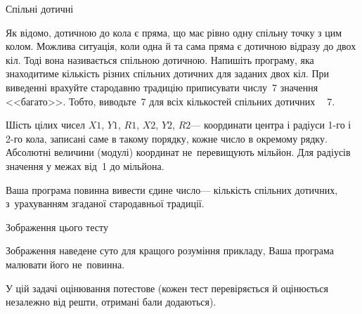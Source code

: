 \begin{problemAllDefault}{Спільні дотичні}

Як відомо, дотичною до кола є пряма, що має рівно одну спільну точ\-ку з цим колом. 
Можлива ситуація, коли одна й та сама пряма є дотичною  відразу до двох кіл. 
Тоді вона називається спільною дотич\-ною. 
Напишіть програму, яка знаходитиме кількість різних спільних дотичних для заданих двох кіл. 
При виведенні \mbox{врахуйте} стародавню традицію приписувати числу~7 значення <<багато>>. 
Тобто, виводьте~7 для всіх кількостей спільних дотичних~$\>$~7.

\InputFile
Шість цілих чисел $X1$, $Y1$, $R1$, $X2$, $Y2$, $R2$\nolinebreak[3] --- координати центра і радіуси \mbox{1-го} і \mbox{2-го} кола,
записані саме в такому порядку, кожне число в окремому рядку. 
Абсолютні величини (модулі) координат не~перевищують мільйон. Для радіусів значення у межах від~1 до мільйона.

\OutputFile
Ваша програма повинна вивести єдине число\nolinebreak[3] --- %
кількість спільних дотичних, з~урахуванням згаданої стародавньої традиції.


\Example

\begin{exampleSimpleThree}{5em}{5em}{144pt}{Зображення цього тесту}
%
\end{exampleSimpleThree}

\Note
Зображення наведене суто для кращого розуміння прикладу, Ваша програма малювати його не~повинна.

\Scoring
У цій задачі оцінювання потестове (кожен тест перевіряється й оцінюється незалежно від решти, 
отримані бали додаються).

\end{problemAllDefault}

